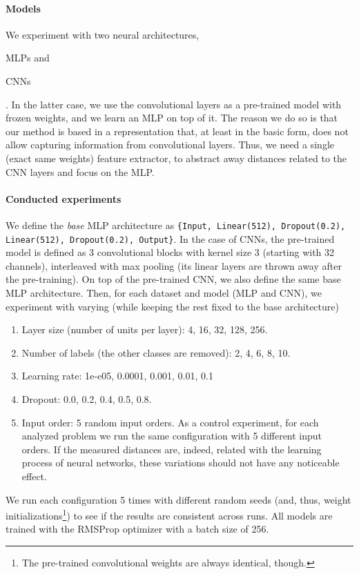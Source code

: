 \documentclass{article}
\begin{document}
\paragraph{Models} We experiment with two neural architectures,\begin{enumerate*} \item MLPs and \item CNNs \end{enumerate*}. In the latter case, we use the convolutional layers as a pre-trained model with frozen weights, and we learn an MLP on top of it. The reason we do so is that our method is based in a representation that, at least in the basic form, does not allow capturing information from convolutional layers. Thus, we need a single (exact same weights) feature extractor, to abstract away distances related to the CNN layers and focus on the MLP.

\paragraph{Conducted experiments} We define the \textit{base} MLP architecture as \texttt{\{Input, Linear(512), Dropout(0.2), Linear(512), Dropout(0.2), Output\}}. In the case of CNNs, the pre-trained model is defined as 3 convolutional blocks with kernel size 3 (starting with 32 channels), interleaved with max pooling (its linear layers are thrown away after the pre-training). On top of the pre-trained CNN, we also define the same base MLP architecture. Then, for each dataset and model (MLP and CNN), we experiment with varying (while keeping the rest fixed to the base architecture) \begin{enumerate}
    \item Layer size (number of units per layer): 4, 16, 32, 128, 256.
    \item Number of labels (the other classes are removed): 2, 4, 6, 8, 10.
    \item Learning rate: 1e-e05, 0.0001, 0.001, 0.01, 0.1
    \item Dropout: 0.0, 0.2, 0.4, 0.5, 0.8.
    \item Input order: 5 random input orders. As a control experiment, for each analyzed problem we run the same configuration with 5 different  input orders. If the measured distances are, indeed, related with the learning process of neural networks, these variations should not have any noticeable effect.
\end{enumerate} We run each configuration 5 times with different random seeds (and, thus, weight initializations\footnote{The pre-trained convolutional weights are always identical, though.}) to see if the results are consistent across runs. All models are trained with the RMSProp optimizer with a batch size of 256.
\end{document}
